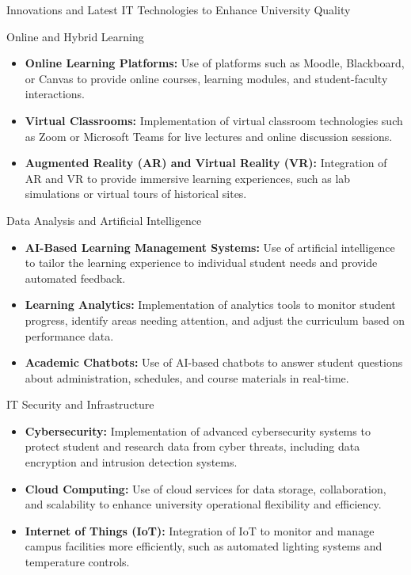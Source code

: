 \documentclass[aspectratio=169, table]{beamer}
\begin{document}
\begin{frame}
	\centering
	\Huge Innovations and Latest IT Technologies to Enhance University Quality
\end{frame}

\begin{frame}{Online and Hybrid Learning}
	\begin{itemize}
		\item \textbf{Online Learning Platforms:} Use of platforms such as Moodle, Blackboard, or Canvas to provide online courses, learning modules, and student-faculty interactions.
		\item \textbf{Virtual Classrooms:} Implementation of virtual classroom technologies such as Zoom or Microsoft Teams for live lectures and online discussion sessions.
		\item \textbf{Augmented Reality (AR) and Virtual Reality (VR):} Integration of AR and VR to provide immersive learning experiences, such as lab simulations or virtual tours of historical sites.
	\end{itemize}
\end{frame}

\begin{frame}{Data Analysis and Artificial Intelligence}
	\begin{itemize}
		\item \textbf{AI-Based Learning Management Systems:} Use of artificial intelligence to tailor the learning experience to individual student needs and provide automated feedback.
		\item \textbf{Learning Analytics:} Implementation of analytics tools to monitor student progress, identify areas needing attention, and adjust the curriculum based on performance data.
		\item \textbf{Academic Chatbots:} Use of AI-based chatbots to answer student questions about administration, schedules, and course materials in real-time.
	\end{itemize}
\end{frame}

\begin{frame}{IT Security and Infrastructure}
	\begin{itemize}
		\item \textbf{Cybersecurity:} Implementation of advanced cybersecurity systems to protect student and research data from cyber threats, including data encryption and intrusion detection systems.
		\item \textbf{Cloud Computing:} Use of cloud services for data storage, collaboration, and scalability to enhance university operational flexibility and efficiency.
		\item \textbf{Internet of Things (IoT):} Integration of IoT to monitor and manage campus facilities more efficiently, such as automated lighting systems and temperature controls.
	\end{itemize}
\end{frame}
\end{document}
